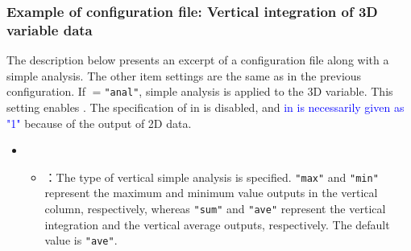 \subsubsection{Example of configuration file: Vertical integration of 3D variable data}
The description below presents an excerpt of a configuration file along with a simple analysis. The other item settings are the same as in the previous configuration.
If $=$\verb|"anal"|, simple analysis is applied to the 3D variable.
This setting enables .
The specification of  in  is disabled,
and \textcolor{blue}{ in  is necessarily given as "1"}
because of the output of 2D data.
\begin{itemize}
 \item {}
 \begin{itemize}
  \item {}：The type of vertical simple analysis is specified. \verb|"max"| and \verb|"min"| 
    represent the maximum and minimum value outputs in the vertical column, respectively, whereas \verb|"sum"| and \verb|"ave"| represent
    the vertical integration and the vertical average outputs, respectively. The default value is \verb|"ave"|.
 \end{itemize}
\end{itemize}

